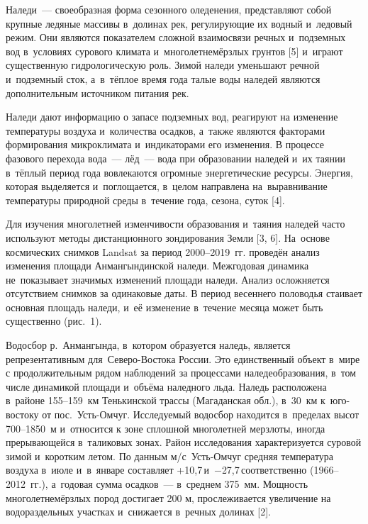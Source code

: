  

\makeProcTitle
{}

Наледи~--- своеобразная форма сезонного оледенения, представляют собой крупные ледяные массивы в~долинах рек, регулирующие их водный и~ледовый режим.  Они являются показателем сложной взаимосвязи речных и~подземных вод в~условиях сурового климата и~многолетнемёрзлых грунтов [5] и~играют существенную гидрологическую роль. Зимой наледи уменьшают речной и~подземный сток, а~в~тёплое время года талые воды наледей являются дополнительным источником питания рек.

Наледи дают информацию о запасе подземных вод, реагируют на изменение температуры воздуха и~количества осадков, а~также являются факторами формирования микроклимата и~индикаторами его изменения. В процессе фазового перехода вода~--- лёд~--- вода при образовании наледей и~их таянии в~тёплый период года вовлекаются огромные энергетические ресурсы. Энергия, которая выделяется и~поглощается, в~целом направлена на~выравнивание температуры природной среды в~течение года, сезона, суток [4].

Для изучения многолетней изменчивости образования и~таяния наледей часто используют методы дистанционного зондирования Земли [3, 6]. На~основе космических снимков Landsat за период 2000--2019~гг. проведён анализ изменения площади Анмангындинской наледи. Межгодовая динамика не~показывает значимых изменений площади наледи. Анализ осложняется отсутствием снимков за одинаковые даты. В период весеннего половодья стаивает основная площадь наледи, и~её изменение в~течение месяца может быть существенно (рис.~1).



Водосбор р.~Анмангында, в~котором образуется наледь, является репрезентативным для~Северо-Востока России. Это единственный объект в~мире с продолжительным рядом наблюдений за процессами наледеобразования, в~том числе динамикой площади и~объёма наледного льда. Наледь расположена в~районе 155--159~км Тенькинской трассы (Магаданская обл.), в~30~км к~юго-востоку от пос.~Усть-Омчуг. Исследуемый водосбор находится в~пределах высот 700--1850~м и~относится к зоне сплошной многолетней мерзлоты, иногда прерывающейся в~таликовых зонах. Район исследования характеризуется суровой зимой и~коротким летом. По данным м/с~Усть-Омчуг средняя температура воздуха в~июле и~в~январе составляет +10,7\,\dgc и~$-$27,7\,\dgc соответственно (1966--2012~гг.), а~годовая сумма осадков~--- в~среднем 375~мм. Мощность многолетнемёрзлых пород достигает 200 м, прослеживается увеличение на водораздельных участках и~снижается в~речных долинах [2].

